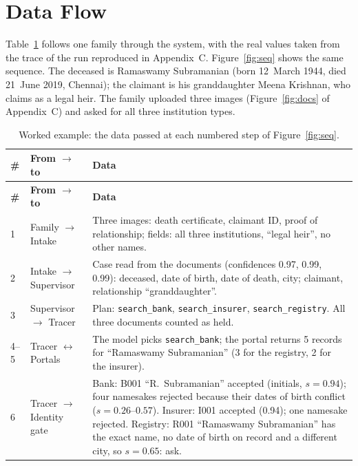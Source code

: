\documentclass[12pt,a4paper,oneside]{report}
\begin{document}
\section{Data Flow}
Table~\ref{tab:seq} follows one family through the system, with the real values taken from the trace of the run reproduced in Appendix~C. Figure~\ref{fig:seq} shows the same sequence. The deceased is Ramaswamy Subramanian (born 12~March 1944, died 21~June 2019, Chennai); the claimant is his granddaughter Meena Krishnan, who claims as a legal heir. The family uploaded three images (Figure~\ref{fig:docs} of Appendix~C) and asked for all three institution types.





{\footnotesize{}
\renewcommand{\arraystretch}{1.1}
\begin{longtable}{@{}l p{2.5cm} p{9.0cm}@{}}
\caption[Worked example: data at each step]{Worked example: the data passed at each numbered step of Figure~\ref{fig:seq}.}\label{tab:seq}\\
\toprule
\textbf{\#} & \textbf{From $\to$ to} & \textbf{Data} \\ \midrule
\endfirsthead
\toprule
\textbf{\#} & \textbf{From $\to$ to} & \textbf{Data} \\ \midrule
\endhead
1 & Family $\to$ Intake & Three images: death certificate, claimant ID, proof of relationship; fields: all three institutions, ``legal heir'', no other names. \\
2 & Intake $\to$ Supervisor & Case read from the documents (confidences 0.97, 0.99, 0.99): deceased, date of birth, date of death, city; claimant, relationship ``granddaughter''. \\
3 & Supervisor $\to$ Tracer & Plan: \texttt{search\_bank}, \texttt{search\_insurer}, \texttt{search\_registry}. All three documents counted as held. \\
4--5 & Tracer $\leftrightarrow$ Portals & The model picks \texttt{search\_bank}; the portal returns 5 records for ``Ramaswamy Subramanian'' (3 for the registry, 2 for the insurer). \\
6 & Tracer $\to$ Identity gate & Bank: B001 ``R.\ Subramanian'' accepted (initials, $s=0.94$); four namesakes rejected because their dates of birth conflict ($s=0.26$--$0.57$). Insurer: I001 accepted (0.94); one namesake rejected. Registry: R001 ``Ramaswamy Subramanian'' has the exact name, no date of birth on record and a different city, so $s=0.65$: ask. \\

\end{longtable}}
\end{document}
